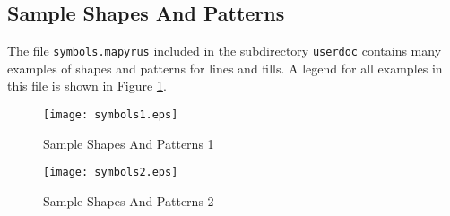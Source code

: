 \subsection{Sample Shapes And Patterns}
The file \texttt{symbols.mapyrus} included in the subdirectory
\texttt{userdoc} contains many examples of shapes and patterns
for lines and fills.  A legend for all examples in this file is shown
in Figure \ref{samplesymbols}.

\begin{figure}[htb]
\label{samplesymbols}
\texttt{[image: symbols1.eps]}
\caption{Sample Shapes And Patterns 1}
\end{figure}

\begin{figure}[htb]
\texttt{[image: symbols2.eps]}
\caption{Sample Shapes And Patterns 2}
\end{figure}

